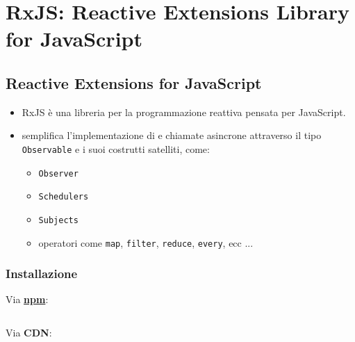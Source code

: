     \section{RxJS: Reactive Extensions Library for JavaScript}\label{sec:rxjs}
        \subsection{Reactive Extensions for JavaScript}\label{subsec:rxjs}
        \begin{frame}[fragile]{\insertsectionhead}

            \begin{block}{\insertsubsectionhead\footnotemark}
                \begin{itemize}
                    \item
                        RxJS è una libreria per la programmazione reattiva pensata per JavaScript.
                    \item
                        semplifica l'implementazione di  e chiamate asincrone attraverso il tipo \texttt{Observable} e i suoi costrutti satelliti, come:
                        \begin{itemize}
                            \item \texttt{Observer}
                            \item \texttt{Schedulers}
                            \item \texttt{Subjects}
                            \item operatori come \texttt{map}, \texttt{filter}, \texttt{reduce}, \texttt{every}, ecc ...
                        \end{itemize}
                \end{itemize}
            \end{block}

            \subsubsection{Installazione}\label{subsec:install}
            \begin{block}{\insertsubsubsectionhead}
                \begin{itemize}
                    {
                        \footnotesize
                        \item
                            Via \textbf{\small\url{npm}}:
                            \inputminted[fontsize=\scriptsize]{text}{res/npm_install.sh}
                        \item
                            Via \textbf{\footnotesize CDN}:
                            \inputminted[fontsize=\scriptsize]{text}{res/cdn_install.html}
                    }
                \end{itemize}
            \end{block}

        \end{frame}
        

